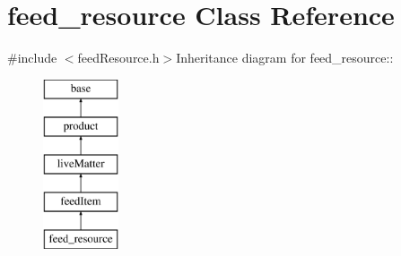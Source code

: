 \hypertarget{classfeed__resource}{
\section{feed\_\-resource Class Reference}
\label{classfeed__resource}
}


{\ttfamily \#include $<$feedResource.h$>$}Inheritance diagram for feed\_\-resource::\begin{figure}[H]
\begin{center}
\leavevmode
\includegraphics[height=5cm]{classfeed__resource}
\end{center}
\end{figure}
